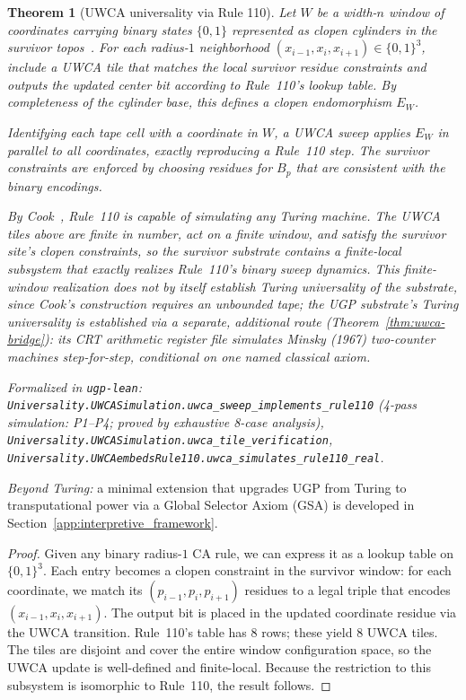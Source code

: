 \documentclass[12pt]{article}
\newtheorem{theorem}{Theorem}[section]
\numberwithin{equation}{section}
\begin{document}
\begin{theorem}[UWCA universality via Rule 110]\label{thm:uwca-universal-basic}
Let $W$ be a width-$n$ window of coordinates carrying binary states $\{0,1\}$ represented as clopen cylinders in the survivor topos~\cite{SpivackUGPFormalization,ugp-lean}. For each radius-$1$ neighborhood $(x_{i-1},x_i,x_{i+1})\in\{0,1\}^3$, include a UWCA tile that matches the local survivor residue constraints and outputs the updated center bit according to Rule~110's lookup table. By completeness of the cylinder base, this defines a clopen endomorphism $E_W$.

Identifying each tape cell with a coordinate in $W$, a UWCA sweep applies $E_W$ in parallel to all coordinates, exactly reproducing a Rule~110 step. The survivor constraints are enforced by choosing residues for $B_p$ that are consistent with the binary encodings.

By Cook~\cite{cook2004rule110}, Rule~110 is capable of simulating any Turing machine. The UWCA tiles above are finite in number, act on a finite window, and satisfy the survivor site's clopen constraints, so the survivor substrate contains a finite-local subsystem that exactly realizes Rule~110's binary sweep dynamics. This finite-window realization does not by itself establish Turing universality of the substrate, since Cook's construction requires an unbounded tape; the UGP substrate's Turing universality is established via a separate, additional route (Theorem~\ref{thm:uwca-bridge}): its CRT arithmetic register file simulates Minsky (1967) two-counter machines step-for-step, conditional on one named classical axiom.

\noindent\emph{Formalized in} \texttt{ugp-lean}: \texttt{Universality.UWCASimulation.uwca\_sweep\_implements\_rule110}
(4-pass simulation: P1--P4; proved by exhaustive 8-case analysis),
\texttt{Universality.UWCASimulation.uwca\_tile\_verification},
\texttt{Universality.UWCAembedsRule110.uwca\_simulates\_rule110\_real}.
\end{theorem}

\noindent\emph{Beyond Turing:} a minimal extension that upgrades UGP from Turing to transputational power via a Global Selector Axiom (GSA) is developed in Section~\ref{app:interpretive_framework}.


\begin{proof}
Given any binary radius-$1$ CA rule, we can express it as a lookup table on $\{0,1\}^3$. Each entry becomes a clopen constraint in the survivor window: for each coordinate, we match its $(p_{i-1},p_i,p_{i+1})$ residues to a legal triple that encodes $(x_{i-1},x_i,x_{i+1})$. The output bit is placed in the updated coordinate residue via the UWCA transition. Rule~110's table has $8$ rows; these yield $8$ UWCA tiles. The tiles are disjoint and cover the entire window configuration space, so the UWCA update is well-defined and finite-local. Because the restriction to this subsystem is isomorphic to Rule~110, the result follows.
\end{proof}
\end{document}
